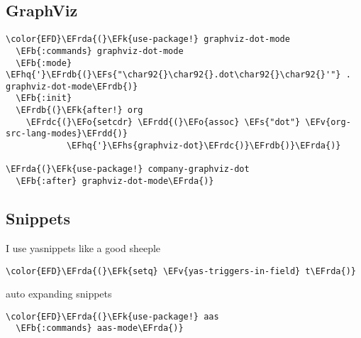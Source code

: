 \documentclass{article}
\newcommand{\EFs}[1]{\textcolor{EFs}{#1}} %
\newcommand{\EFk}[1]{\textcolor{EFk}{#1}} %
\newcommand{\EFb}[1]{\textcolor{EFb}{#1}} %
\newcommand{\EFv}[1]{\textcolor{EFv}{#1}} %
\newcommand{\EFo}[1]{\textcolor{EFo}{#1}} %
\newcommand{\EFhq}[1]{#1} %
\newcommand{\EFhs}[1]{\textcolor{EFhs}{#1}} %
\newcommand{\EFrda}[1]{\textcolor{EFrda}{#1}} %
\newcommand{\EFrdb}[1]{\textcolor{EFrdb}{#1}} %
\newcommand{\EFrdc}[1]{\textcolor{EFrdc}{#1}} %
\newcommand{\EFrdd}[1]{\textcolor{EFrdd}{#1}} %
\begin{document}
\subsection{GraphViz}
\label{sec:orgdefeb59}
\begin{Code}
\begin{Verbatim}
\color{EFD}\EFrda{(}\EFk{use-package!} graphviz-dot-mode
  \EFb{:commands} graphviz-dot-mode
  \EFb{:mode} \EFhq{'}\EFrdb{(}\EFs{"\char92{}\char92{}.dot\char92{}\char92{}'"} . graphviz-dot-mode\EFrdb{)}
  \EFb{:init}
  \EFrdb{(}\EFk{after!} org
    \EFrdc{(}\EFo{setcdr} \EFrdd{(}\EFo{assoc} \EFs{"dot"} \EFv{org-src-lang-modes}\EFrdd{)}
            \EFhq{'}\EFhs{graphviz-dot}\EFrdc{)}\EFrdb{)}\EFrda{)}

\EFrda{(}\EFk{use-package!} company-graphviz-dot
  \EFb{:after} graphviz-dot-mode\EFrda{)}
\end{Verbatim}
\end{Code}

\subsection{Snippets}
\label{sec:org5c7e79b}
I use yasnippets like a good sheeple
\begin{Code}
\begin{Verbatim}
\color{EFD}\EFrda{(}\EFk{setq} \EFv{yas-triggers-in-field} t\EFrda{)}
\end{Verbatim}
\end{Code}
auto expanding snippets
\begin{Code}
\begin{Verbatim}
\color{EFD}\EFrda{(}\EFk{use-package!} aas
  \EFb{:commands} aas-mode\EFrda{)}
\end{Verbatim}
\end{Code}
\end{document}
